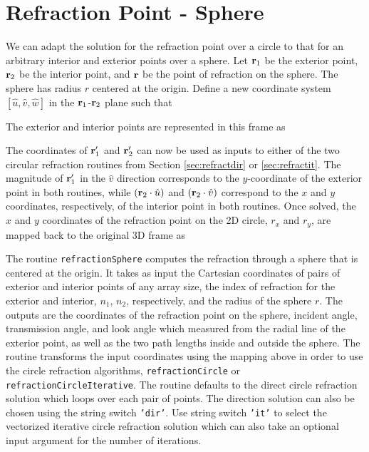 {\footnotesize
{}
}


\section{Refraction Point - Sphere}

We can adapt the solution for the refraction point over a circle to that for an arbitrary interior and exterior points over a sphere.  Let $\mathbf{r}_1$ be the exterior point, $\mathbf{r}_2$ be the interior point, and $\mathbf{r}$ be the point of refraction on the sphere.  The sphere has radius $r$ centered at the origin.  Define a new coordinate system $[\hat{u}, \hat{v}, \hat{w}]$ in the $\mathbf{r}_1$-$\mathbf{r}_2$ plane such that 

The exterior and interior points are represented in this frame as

The coordinates of $\mathbf{r}_1'$ and $\mathbf{r}_2'$ can now be used as inputs to either of the two circular refraction routines from Section \ref{sec:refractdir} or \ref{sec:refractit}. The magnitude of $\mathbf{r}_1'$ in the $\hat{v}$ direction corresponds to the $y$-coordinate of the exterior point in both routines, while $\left( \mathbf{r}_2 \cdot \hat{u}  \right) $ and $\left( \mathbf{r}_2 \cdot \hat{v}  \right)$ correspond to the $x$ and $y$ coordinates, respectively, of the interior point in both routines. Once solved, the $x$ and $y$ coordinates of the refraction point on the 2D circle, $r_x$ and $r_y$, are mapped back to the original 3D frame as 

The routine \texttt{refractionSphere} computes the refraction through a sphere that is centered at the origin. It takes as input the Cartesian coordinates of pairs of exterior and interior points of any array size, the index of refraction for the exterior and interior, $n_1$, $n_2$, respectively, and the radius of the sphere $r$. The outputs are the coordinates of the refraction point on the sphere, incident angle, transmission angle, and look angle which measured from the radial line of the exterior point, as well as the two path lengths inside and outside the sphere. The routine transforms the input coordinates using the mapping above in order to use the circle refraction algorithms, \texttt{refractionCircle} or \texttt{refractionCircleIterative}. The routine defaults to the direct circle refraction solution which loops over each pair of points. The direction solution can also be chosen using the string switch \texttt{'dir'}. Use string switch \texttt{'it'} to select the vectorized iterative circle refraction solution which can also take an optional input argument for the number of iterations.  

